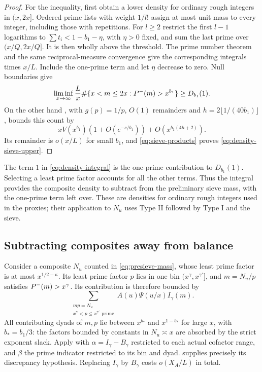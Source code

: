 \begin{proof}
For the inequality, first obtain a lower density for ordinary
rough integers in $(x,2x]$. Ordered prime lists with weight $1/l!$
assign at most unit mass to every integer, including those with
repetitions. For $l\ge2$ restrict the first $l-1$ logarithms to
$\sum t_i<1-b_1-\eta$, with $\eta>0$ fixed, and sum the last prime
over $(x/Q,2x/Q]$. It is then wholly above the threshold. The
prime number theorem and the same reciprocal-measure convergence
give the corresponding integrals times $x/L$. Include the
one-prime term and let $\eta$ decrease to zero. Null boundaries
give
\[
 \liminf_{x\to\infty}\frac Lx
        \#\{x<m\le2x:P^{-}(m)>x^{b_1}\}\ge D_{b_1}(1).
\]
On the other hand , with $g(p)=1/p$, $O(1)$
remainders and $h=2\lfloor1/(40b_1)\rfloor$, bounds this count by
\[
 xV(x^{b_1})(1+O(e^{-c/b_1}))+O(x^{b_1(4h+2)}).
\]
Its remainder is $o(x/L)$ for small $b_1$, and
\eqref{eq:sieve-products} proves \eqref{eq:density-sieve-upper}.
\end{proof}

The term $1$ in \eqref{eq:density-integral} is the one-prime
contribution to $D_{b_1}(1)$. Selecting a least prime factor accounts
for all the other terms. Thus the integral provides the composite
density to subtract from the preliminary sieve mass, with the
one-prime term left over. These are densities for ordinary rough
integers used in the proxies; their application to $N_u$ uses Type II
followed by Type I and the sieve.

\subsection{Subtracting composites away from balance}

Consider a composite $N_u$ counted in \eqref{eq:presieve-mass},
whose least prime factor is at most $x^{1/2-\kappa}$. Its least
prime factor $p$ lies in one bin $(x^\gamma,x^{\gamma'}]$, and
$m=N_u/p$ satisfies $P^{-}(m)>x^\gamma$. Its contribution is
therefore bounded by
\[
 \sum_{\substack{mp=N_u\\x^\gamma<p\le x^{\gamma'}\text{ prime}}}
       A(u)\Psi(u/x)I_\gamma(m).
\]
All contributing dyads of $m,p$ lie between $x^{b_*}$ and
$x^{1-b_*}$ for large $x$, with $b_*=b_1/3$: the factors bounded
by constants in $N_u\asymp x$ are absorbed by the strict exponent
slack. Apply  with
$\alpha=I_\gamma-B_\gamma$ restricted to each actual cofactor
range, and $\beta$ the prime indicator restricted to its bin and
dyad.  supplies precisely its
discrepancy hypothesis. Replacing $I_\gamma$ by $B_\gamma$ costs
$o(X_A/L)$ in total.

